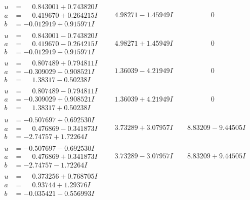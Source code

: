 \documentclass[1p]{elsarticle_modified}
\theoremstyle{definition}
\begin{document}
$$\begin{array}{c|c|c}
\begin{aligned}
u &= \phantom{-}0.843001 + 0.743820 I \\
a &= \phantom{-}0.419670 + 0.264215 I \\
b &= -0.012919 + 0.915971 I\end{aligned}
 & \phantom{-}4.98271 - 1.45949 I & \phantom{-0.000000 } 0 \\ \hline\begin{aligned}
u &= \phantom{-}0.843001 - 0.743820 I \\
a &= \phantom{-}0.419670 - 0.264215 I \\
b &= -0.012919 - 0.915971 I\end{aligned}
 & \phantom{-}4.98271 + 1.45949 I & \phantom{-0.000000 } 0 \\ \hline\begin{aligned}
u &= \phantom{-}0.807489 + 0.794811 I \\
a &= -0.309029 - 0.908521 I \\
b &= \phantom{-}1.38317 - 0.50238 I\end{aligned}
 & \phantom{-}1.36039 - 4.21949 I & \phantom{-0.000000 } 0 \\ \hline\begin{aligned}
u &= \phantom{-}0.807489 - 0.794811 I \\
a &= -0.309029 + 0.908521 I \\
b &= \phantom{-}1.38317 + 0.50238 I\end{aligned}
 & \phantom{-}1.36039 + 4.21949 I & \phantom{-0.000000 } 0 \\ \hline\begin{aligned}
u &= -0.507697 + 0.692530 I \\
a &= \phantom{-}0.476869 - 0.341873 I \\
b &= -2.74757 + 1.72264 I\end{aligned}
 & \phantom{-}3.73289 + 3.07957 I & \phantom{-}8.83209 - 9.44505 I \\ \hline\begin{aligned}
u &= -0.507697 - 0.692530 I \\
a &= \phantom{-}0.476869 + 0.341873 I \\
b &= -2.74757 - 1.72264 I\end{aligned}
 & \phantom{-}3.73289 - 3.07957 I & \phantom{-}8.83209 + 9.44505 I \\ \hline\begin{aligned}
u &= \phantom{-}0.373256 + 0.768705 I \\
a &= \phantom{-}0.93744 + 1.29376 I \\
b &= -0.035421 - 0.556993 I\end{aligned}

\end{array}$$
\end{document}
